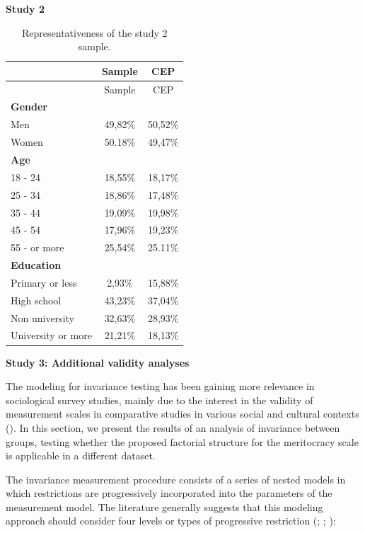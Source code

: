 \documentclass[
  10pt,
  a4paper,
]{article}
\begin{document}
\pagebreak

\textbf{Study 2}

\begin{longtable}[]{@{}lcc@{}}
\caption{\label{tab:rep-samp} Representativeness of the study 2 sample.}\tabularnewline
\toprule\noalign{}
& Sample & CEP \\
\midrule\noalign{}
\endfirsthead
\toprule\noalign{}
& Sample & CEP \\
\midrule\noalign{}
\endhead
\bottomrule\noalign{}
\endlastfoot
\textbf{Gender} & & \\
Men & 49,82\% & 50,52\% \\
Women & 50.18\% & 49,47\% \\
\textbf{Age} & & \\
18 - 24 & 18,55\% & 18,17\% \\
25 - 34 & 18,86\% & 17,48\% \\
35 - 44 & 19.09\% & 19,98\% \\
45 - 54 & 17,96\% & 19,23\% \\
55 - or more & 25,54\% & 25.11\% \\
\textbf{Education} & & \\
Primary or less & 2,93\% & 15,88\% \\
High school & 43,23\% & 37,04\% \\
Non university & 32,63\% & 28,93\% \\
University or more & 21,21\% & 18,13\% \\
\end{longtable}

\textbf{Study 3: Additional validity analyses}

The modeling for invariance testing has been gaining more relevance in sociological survey studies, mainly due to the interest in the validity of measurement scales in comparative studies in various social and cultural contexts (). In this section, we present the results of an analysis of invariance between groups, testing whether the proposed factorial structure for the meritocracy scale is applicable in a different dataset.

The invariance measurement procedure consists of a series of nested models in which restrictions are progressively incorporated into the parameters of the measurement model. The literature generally suggests that this modeling approach should consider four levels or types of progressive restriction (; ; ):
\end{document}
